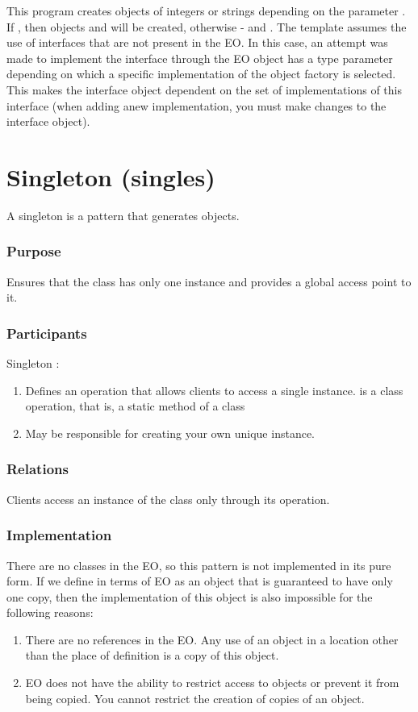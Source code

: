 \documentclass[12pt]{book}
\begin{document}
{{This program creates objects of integers or strings depending on the  parameter \ff{[0]}. If  , then objects  and  will be created, otherwise -    and  .
The template assumes the use of interfaces that are not present in the  EO. In this case, an attempt was made to implement the interface through the EO  object has a type parameter depending on which a specific implementation of the object factory is selected. This makes the interface object dependent on the set of implementations of this interface (when adding anew implementation, you must make changes to the interface object).

\section{Singleton (singles)}
A singleton is a pattern that generates objects.

\subsubsection{Purpose}
Ensures that the class has only one instance and provides a global access point to it.

\subsubsection{Participants}
Singleton :
\begin{enumerate}
    \item Defines an  operation that allows clients to access a single instance.  is a class operation,  that is,  a static method of a class
    \item May be responsible for creating your own unique instance.
\end{enumerate}

\subsubsection{Relations}
Clients access an instance of the  class only through its  operation. 

\subsubsection{Implementation}
There are no classes in the EO, so this pattern is not implemented in its pure form. If we define  in  terms  of  EO as an object that is guaranteed to have only one copy, then the implementation of this object is also impossible for the following reasons:
\begin{enumerate}
    \item There are no references in the EO.  Any use of an object in a location other than the place of definition is a copy of this object.
    \item EO  does not have the ability to restrict access to objects or prevent it from being copied. You cannot restrict the creation of copies of an object.


\end{enumerate}}}
\end{document}
